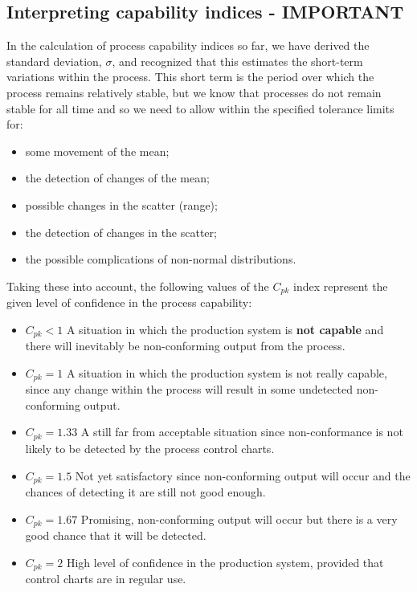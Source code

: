 \documentclass[11pt]{article} %
\begin{document}
					\subsection*{Interpreting capability indices - IMPORTANT}
					In the calculation of process capability indices so far, we have derived the
					standard deviation, $\sigma$, and recognized that this estimates the short-term variations within the process. This short term is the period over which the process remains relatively stable, but we know that processes do not remain stable for all time and so we need to allow within the specified tolerance limits for:
					
					\begin{itemize}
						\item	some movement of the mean;
						\item	the detection of changes of the mean;
						\item	possible changes in the scatter (range);
						\item	the detection of changes in the scatter;
						\item	the possible complications of non-normal distributions.
					\end{itemize}
					Taking these into account, the following values of the $C_{pk}$ index represent the given level of confidence in the process capability:
					
					\begin{itemize}
						\item	$C_{pk} < 1$ A situation in which the production system is \textbf{not capable} and there will inevitably be non-conforming output from the process.
						
						\item	$C_{pk} = 1$ A situation in which the production system is not really capable, since any change within the process will result in some undetected non-conforming output.
						
						\item	$C_{pk} = 1.33$ A still far from acceptable situation since non-conformance is not likely to be detected by the process control charts.
						
						\item	$C_{pk} = 1.5$ Not yet satisfactory since non-conforming output will occur and the chances of detecting it are still not good enough.
						
						\item	$C_{pk} = 1.67$ Promising, non-conforming output will occur but there is a very good chance that it will be detected.
						
						\item	$C_{pk} = 2$ High level of confidence in the production system, provided that control charts are in regular use.
						
					\end{itemize}
\newpage
\end{document}
